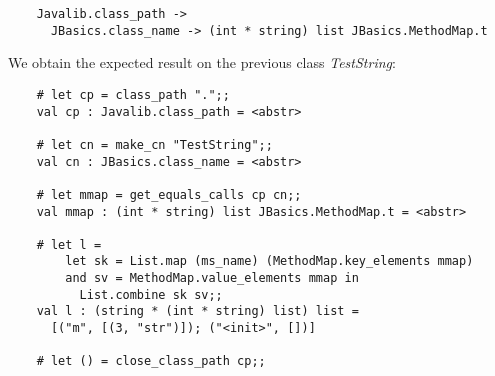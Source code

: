 \documentclass{article}
\begin{document}
\begin{verbatim}
    Javalib.class_path ->
      JBasics.class_name -> (int * string) list JBasics.MethodMap.t
\end{verbatim}
We obtain the expected result on the previous class
\emph{TestString}:

\begin{verbatim}
    # let cp = class_path ".";;
    val cp : Javalib.class_path = <abstr>

    # let cn = make_cn "TestString";;
    val cn : JBasics.class_name = <abstr>

    # let mmap = get_equals_calls cp cn;;
    val mmap : (int * string) list JBasics.MethodMap.t = <abstr>

    # let l = 
        let sk = List.map (ms_name) (MethodMap.key_elements mmap)
        and sv = MethodMap.value_elements mmap in
          List.combine sk sv;;
    val l : (string * (int * string) list) list =
      [("m", [(3, "str")]); ("<init>", [])]

    # let () = close_class_path cp;;
\end{verbatim}
\end{document}
